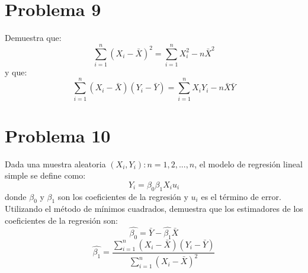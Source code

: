 \documentclass[]{article}
\begin{document}
\section*{Problema 9}

Demuestra que: 
$$
\sum_{i=1}^{n}
(X_i-\bar{X})^2
=
\sum_{i=1}^{n}
X_{i}^{2}
-
n
\bar{X}^2
$$
y que: 
$$
\sum_{i=1}^{n}
(X_i-\bar{X})
(Y_i-\bar{Y})
=
\sum_{i=1}^{n}
X_iY_i
-
n
\bar{X}
\bar{Y}
$$

\section*{Problema 10}

Dada una muestra aleatoria ${(X_i,Y_i):n=1,2,...,n}$, el modelo de regresión lineal simple se define como:
$$
Y_i=
\beta_0
\beta_1X_i
u_i
$$
donde $\beta_0$ y $\beta_1$ son los coeficientes de la regresión y $u_i$ es el término de error. Utilizando el método de mínimos cuadrados, demuestra que los estimadores de los coeficientes de la regresión son:
$$
\hat{\beta_0}=\bar{Y}-\hat{\beta_1}\bar{X}
$$
$$
\hat{\beta_1}
=
\frac
{
	\sum_{i=1}^{n}
	(X_i-\bar{X})
	(Y_i-\bar{Y})
}
{
	\sum_{i=1}^{n}
	(X_i-\bar{X})^2
}
$$
\end{document}
